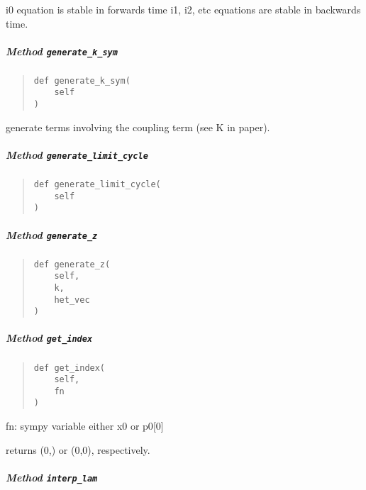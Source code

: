 \documentclass[english,a4paper,oneside]{article}
\let\oldsubparagraph\subparagraph
\renewcommand{\subparagraph}[1]{\oldsubparagraph{#1}\mbox{}}
\begin{document}
i0 equation is stable in forwards time i1, i2, etc equations are stable
in backwards time.

\hypertarget{nBodyCoupling.nBodyCoupling.generate_k_sym}{%
\subparagraph{\texorpdfstring{Method
\texttt{generate\_k\_sym}}{Method generate\_k\_sym}}\label{nBodyCoupling.nBodyCoupling.generate_k_sym}}

\begin{quote}
\begin{verbatim}
def generate_k_sym(
    self
)
\end{verbatim}
\end{quote}

generate terms involving the coupling term (see K in paper).

\hypertarget{nBodyCoupling.nBodyCoupling.generate_limit_cycle}{%
\subparagraph{\texorpdfstring{Method
\texttt{generate\_limit\_cycle}}{Method generate\_limit\_cycle}}\label{nBodyCoupling.nBodyCoupling.generate_limit_cycle}}

\begin{quote}
\begin{verbatim}
def generate_limit_cycle(
    self
)
\end{verbatim}
\end{quote}

\hypertarget{nBodyCoupling.nBodyCoupling.generate_z}{%
\subparagraph{\texorpdfstring{Method
\texttt{generate\_z}}{Method generate\_z}}\label{nBodyCoupling.nBodyCoupling.generate_z}}

\begin{quote}
\begin{verbatim}
def generate_z(
    self,
    k,
    het_vec
)
\end{verbatim}
\end{quote}

\hypertarget{nBodyCoupling.nBodyCoupling.get_index}{%
\subparagraph{\texorpdfstring{Method
\texttt{get\_index}}{Method get\_index}}\label{nBodyCoupling.nBodyCoupling.get_index}}

\begin{quote}
\begin{verbatim}
def get_index(
    self,
    fn
)
\end{verbatim}
\end{quote}

fn: sympy variable either x0 or p0{[}0{]}

returns (0,) or (0,0), respectively.

\hypertarget{nBodyCoupling.nBodyCoupling.interp_lam}{%
\subparagraph{\texorpdfstring{Method
\texttt{interp\_lam}}{Method interp\_lam}}\label{nBodyCoupling.nBodyCoupling.interp_lam}}
\end{document}
